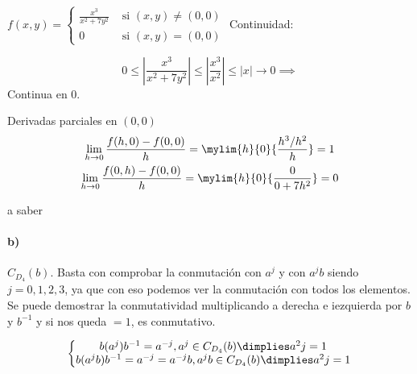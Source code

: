 \begin{problem}[?]
\solution
$f(x,y) = \left\{\begin{matrix}
                \displaystyle \frac{x^3}{x^2+7y^2} & \text{ si } (x,y) \neq (0,0)\\
                 0 & \text{ si } (x,y) = (0,0)
                \end{matrix}\right.$
Continuidad:

$$0\leq \left| \frac{x^3}{x^2+7y^2} \right| \leq \left| \frac{x^3}{x^2} \right| \leq |x| \rightarrow 0 \implies$$ Continua en 0.

Derivadas parciales en $(0,0)$
\begin{gather*}
\lim_{h \to 0} {\frac{f(h,0) - f(0,0)}{h}} = \mylim{h}{0} {\displaystyle\frac{{h^{3}}/{h^{2}}}{h}} = 1\\
\lim_{h\to 0} {\frac{f(0,h) - f(0,0)}{h}} = \mylim{h}{0} {\frac{0}{0+7h^2}} = 0
\end{gather*}
\end{problem}
 
\begin{problem}[5]
a saber
\solution

\paragraph{b)}
$C_{D_4}(b)$. Basta con comprobar la conmutación con $a^j$ y con $a^jb$ siendo $j = 0,1,2,3$, ya que con eso podemos ver la conmutación con todos los elementos. Se puede demostrar la conmutatividad multiplicando a derecha e iezquierda por $b$ y $b^{-1}$ y si nos queda $=1$, es conmutativo.

$$\left\{\begin{matrix}b(a^j)b^{-1} = a^{-j}, a^j \in C_{D_4}(b) \dimplies a^2j = 1\\
b(a^jb)b^{-1} = a^{-j} = a^{-j}b, a^jb \in C_{D_4}(b) \dimplies a^2j = 1\end{matrix}\right.$$
\end{problem}


